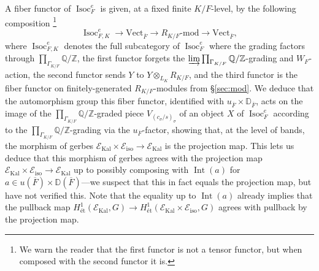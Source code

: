 \documentclass[11pt]{amsart}
\theoremstyle{definition}
\newcommand{\mc}{\mathcal}
\newcommand{\Z}{\mathbb{Z}}
\newcommand{\Q}{\mathbb{Q}}
\newcommand{\ov}{\overline}
\newcommand{\Vect}{\mathrm{Vect}}
\DeclareMathOperator{\Kal}{Kal}
\DeclareMathOperator{\Int}{Int}
\DeclareMathOperator{\Isoc}{Isoc}
\begin{document}
A fiber functor of $\Isoc_{F}^{e}$ is given, at a fixed finite $K/F$-level, by the following composition \footnote{We warn the reader that the first functor is not a tensor functor, but when composed with the second functor it is.}
\begin{equation*}
    \Isoc_{F,K}^{e} \to \Vect_{\ov{F}} \to \text{$R_{K/F}$-mod} \to \Vect_{\ov{F}},
\end{equation*}
where $\Isoc_{F,K}^{e}$ denotes the full subcategory of $\Isoc_{F}^{e}$ where the grading factors through $\prod_{\Gamma_{K/F}} \Q/\Z$, the first functor forgets the $\varinjlim \prod_{\Gamma_{K/F}} \Q/\Z$-grading and $W_{F}$-action, the second functor sends $Y$ to $Y \otimes_{L_{K}} R_{K/F}$, and the third functor is the fiber functor on finitely-generated $R_{K/F}$-modules from \S \ref{sec:mod}. We deduce that the automorphism group this fiber functor, identified with $u_{\ov{F}} \times \mathbb{D}_{\ov{F}}$, acts on the image of the $\prod_{\Gamma_{K/F}} \Q/\Z$-graded piece $V_{(c_{\sigma}/s)_{\sigma}}$ of an object $X$ of $\Isoc_{F}^{e}$ according to the $\prod_{\Gamma_{K/F}} \Q/\Z$-grading via the $u_{\ov{F}}$-factor, showing that, at the level of bands, the morphism of gerbes $\mc{E}_{\Kal} \times \mc{E}_{\text{iso}} \to \mc{E}_{\Kal}$ is the projection map. This lets us deduce that this morphism of gerbes agrees with the projection map $\mc{E}_{\Kal} \times \mc{E}_{\text{iso}} \to \mc{E}_{\Kal}$ up to possibly composing with $\Int(a)$ for $a \in u(\ov{F}) \times \mathbb{D}(\ov{F})$---we suspect that this in fact equals the projection map, but have not verified this. Note that the equality up to $\Int(a)$ already implies that the pullback map $H^{1}_{\text{\'{e}t}}(\mc{E}_{\Kal}, G) \to H^{1}_{\text{\'{e}t}}(\mc{E}_{\Kal} \times \mc{E}_{\text{iso}},G)$ agrees with pullback by the projection map.
\end{document}
